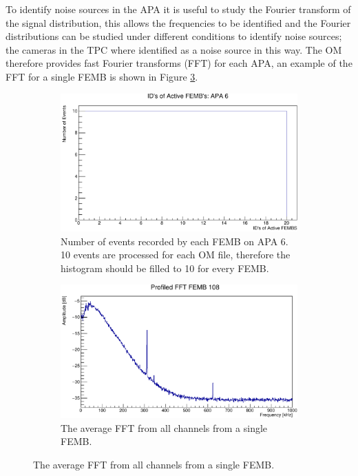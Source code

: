 To identify noise sources in the APA it is useful to study the Fourier transform
of the signal distribution, this allows the frequencies to be identified and the
Fourier distributions can be studied under different conditions to identify
noise sources; the cameras in the TPC where identified as a noise source in
this way. The OM therefore provides fast Fourier transforms (FFT) for each
APA, an example of the FFT for a single FEMB is shown in Figure
\ref{fig:TPC_FFT}.

\begin{figure}

	\centering

	\begin{subfigure}[b]{0.75\textwidth}
		\centering
		\includegraphics[width=\textwidth]{figures/active_femb.pdf}
		\caption {Number of events recorded by each FEMB on APA 6. 10 events are
		processed for each OM file, therefore the histogram should be filled to 10
		for every FEMB.}
		\label{fig:active_femb}
	\end{subfigure}

	\begin{subfigure}[b]{0.75\textwidth}
		\centering
		\vspace{3mm}
		\includegraphics[width=\textwidth]{figures/tpc_fft.pdf}
		\caption {The average FFT from all channels from a single FEMB.}
		\label{fig:TPC_FFT}
	\end{subfigure}


\end{figure}
